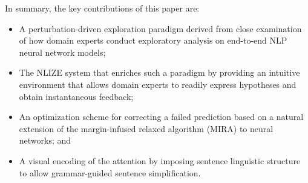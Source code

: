 In summary, the key contributions of this paper are:
\begin{itemize}
    \item A perturbation-driven exploration paradigm derived from close examination of how domain experts conduct exploratory analysis on end-to-end NLP neural network models;
    
    \item The NLIZE system that enriches such a paradigm by providing an intuitive environment that allows domain experts to readily express hypotheses and obtain instantaneous feedback; 

    \item An optimization scheme for correcting a failed prediction based on a natural extension of the margin-infused relaxed algorithm (MIRA) to neural networks; and
    
    \item A visual encoding of the attention by imposing sentence linguistic structure to allow grammar-guided sentence simplification.
\end{itemize}
%




